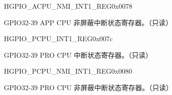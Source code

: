 \begin{register}{H}{GPIO\_ACPU\_NMI\_INT1\_REG}{0x0078}\label{regdesc:GPIOACPUNMIINT1REG}
%
%
\regnewline%
\begin{regdesc}\begin{reglist}
\item [GPIO\_APPCPU\_NMI\_INT]GPIO32-39 APP CPU 非屏蔽中断状态寄存器。（只读）
\end{reglist}\end{regdesc}
\end{register}


\begin{register}{H}{GPIO\_PCPU\_INT1\_REG}{0x007c}\label{regdesc:GPIOPCPUINT1REG}
%
%
\regnewline%
\begin{regdesc}\begin{reglist}
\item [GPIO\_PROCPU\_INT]GPIO32-39 PRO CPU 中断状态寄存器。（只读）
\end{reglist}\end{regdesc}
\end{register}


\begin{register}{H}{GPIO\_PCPU\_NMI\_INT1\_REG}{0x0080}\label{regdesc:GPIOPCPUNMIINT1REG}
%
%
\regnewline%
\begin{regdesc}\begin{reglist}
\item [GPIO\_PROCPU\_NMI\_INT]GPIO32-39 PRO CPU 非屏蔽中断状态寄存器。（只读）
\end{reglist}\end{regdesc}
\end{register}


